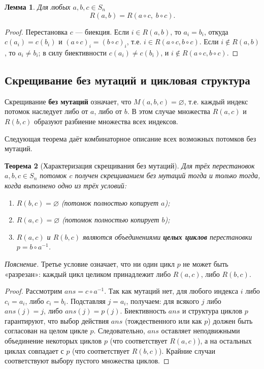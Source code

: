 \documentclass[732]{studrep}
\newcommand{\ans}{\mathit{ans}}          %
\newtheorem{theorem}{Теорема}[section]
\newtheorem{lemma}[theorem]{Лемма}
\theoremstyle{nonumberplain}
\newtheorem{proof}{Доказательство}
\begin{document}
\begin{lemma}\label{lem:R_comp}
Для любых $a,b,c\in S_n$
\[
R(a,b) = R(a\circ c,\; b\circ c).
\]
\end{lemma}
\begin{proof}
Перестановка $c$ — биекция. Если $i\in R(a,b)$, то $a_i=b_i$, откуда $c(a_i)=c(b_i)$ и $(a\circ c)_i=(b\circ c)_i$, т.е. $i\in R(a\circ c,b\circ c)$.
Если $i\notin R(a,b)$, то $a_i\neq b_i$; в силу биективности $c(a_i)\neq c(b_i)$, и $i\notin R(a\circ c,b\circ c)$.
\end{proof}

\subsection{Скрещивание без мутаций и цикловая структура}
\label{sec:no_mutation}

Скрещивание \textbf{без мутаций} означает, что $M(a,b,c)=\varnothing$, т.е. каждый индекс потомок наследует либо от $a$, либо от $b$. В этом случае множества $R(a,c)$ и $R(b,c)$ образуют разбиение множества всех индексов.

Следующая теорема даёт комбинаторное описание всех возможных потомков без мутаций.

\begin{theorem}[Характеризация скрещивания без мутаций]\label{thm:char}
Для трёх перестановок $a,b,c\in S_n$ потомок $c$ получен скрещиванием без мутаций тогда и только тогда, когда выполнено одно из трёх условий:
\begin{enumerate}
\item $R(b,c)=\varnothing$ (потомок полностью копирует $a$);
\item $R(a,c)=\varnothing$ (потомок полностью копирует $b$);
\item $R(a,c)$ и $R(b,c)$ являются объединениями \textbf{целых циклов} перестановки $p = b\circ a^{-1}$.
\end{enumerate}
\end{theorem}

\textit{Пояснение.} Третье условие означает, что ни один цикл $p$ не может быть «разрезан»: каждый цикл целиком принадлежит либо $R(a,c)$, либо $R(b,c)$.

\begin{proof}
Рассмотрим $\ans = c\circ a^{-1}$. Так как мутаций нет, для любого индекса $i$ либо $c_i = a_i$, либо $c_i = b_i$. Подставляя $j = a_i$, получаем: для всякого $j$ либо $\ans(j)=j$, либо $\ans(j)=p(j)$. Биективность $\ans$ и структура циклов $p$ гарантируют, что выбор действия $\ans$ (тождественного или как $p$) должен быть согласован на целом цикле $p$. Следовательно, $\ans$ оставляет неподвижными объединение некоторых циклов $p$ (что соответствует $R(a,c)$), а на остальных циклах совпадает с $p$ (что соответствует $R(b,c)$). Крайние случаи соответствуют выбору пустого множества циклов.
\end{proof}
\end{document}
